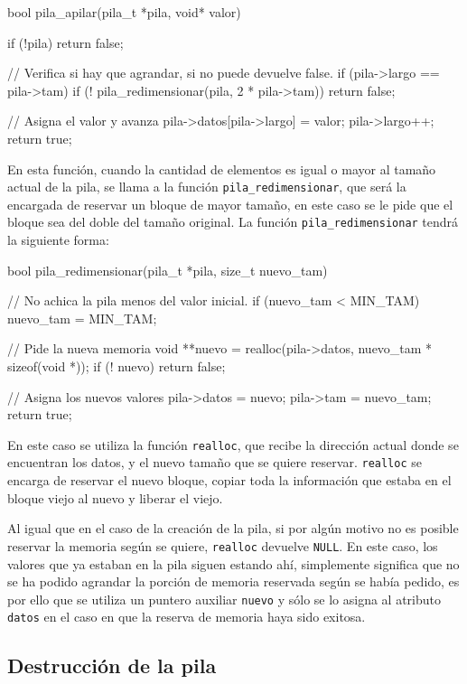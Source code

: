 \begin{codigo-c-plano}
bool pila_apilar(pila_t *pila, void* valor)
{
    if (!pila) return false;

    // Verifica si hay que agrandar, si no puede devuelve false.
    if (pila->largo == pila->tam) {
        if (! pila_redimensionar(pila, 2 * pila->tam)) {
            return false;
        }
    }

    // Asigna el valor y avanza
    pila->datos[pila->largo] = valor;
    pila->largo++;
    return true;
}
\end{codigo-c-plano}

En esta función, cuando la cantidad de elementos es igual o mayor al tamaño
actual de la pila, se llama a la función \lstinline!pila_redimensionar!, que
será la encargada de reservar un bloque de mayor tamaño, en este caso se le
pide que el bloque sea del doble del tamaño original. La función
\lstinline!pila_redimensionar! tendrá la siguiente forma:

\begin{codigo-c-plano}
bool pila_redimensionar(pila_t *pila, size_t nuevo_tam)
{
    // No achica la pila menos del valor inicial.
    if (nuevo_tam < MIN_TAM) nuevo_tam = MIN_TAM;

    // Pide la nueva memoria
    void **nuevo = realloc(pila->datos, nuevo_tam * sizeof(void *));
    if (! nuevo) return false;

    // Asigna los nuevos valores
    pila->datos = nuevo;
    pila->tam = nuevo_tam;
    return true;
}
\end{codigo-c-plano}

En este caso se utiliza la función \lstinline!realloc!, que recibe la
dirección actual donde se encuentran los datos, y el nuevo tamaño que se
quiere reservar.  \lstinline!realloc! se encarga de reservar el nuevo bloque,
copiar toda la información que estaba en el bloque viejo al nuevo y liberar el
viejo.

Al igual que en el caso de la creación de la pila, si por algún motivo no es
posible reservar la memoria según se quiere, \lstinline!realloc! devuelve
\lstinline!NULL!.  En este caso, los valores que ya estaban en la pila siguen
estando ahí, simplemente significa que no se ha podido agrandar la porción de
memoria reservada según se había pedido, es por ello que se utiliza un puntero
auxiliar \lstinline!nuevo! y sólo se lo asigna al atributo \lstinline!datos! en
el caso en que la reserva de memoria haya sido exitosa.

\subsection{Destrucción de la pila}

